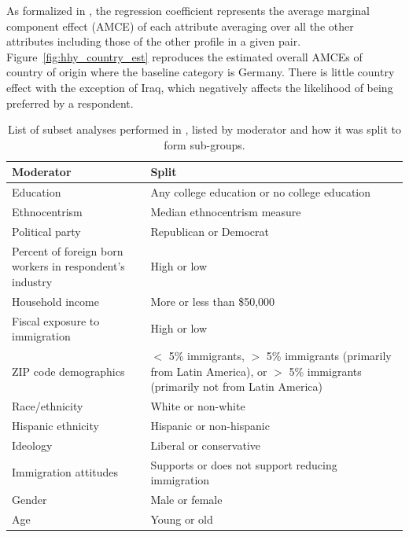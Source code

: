 As formalized in \cite{hainmueller2014causal}, the regression
coefficient represents the average marginal component effect (AMCE) of
each attribute averaging over all the other attributes including those
of the other profile in a given pair. 
Figure~\ref{fig:hhy_country_est} reproduces the estimated overall
AMCEs of country of origin where the baseline category is Germany.
There is little country effect with the exception of Iraq, which
negatively affects the likelihood of being preferred by a respondent.

\begin{table}[t!]
    \centering\small
    \begin{tabular}{|p{0.35\linewidth}|p{0.65\linewidth}|}
    \hline
    Moderator &Split\\
     \hline
     Education & Any college education or no college education\\
     Ethnocentrism & Median ethnocentrism measure\\
     Political party & Republican or Democrat\\
     Percent of foreign born workers in respondent's industry & High or low \\
     Household income & More or less than \$50,000\\
     Fiscal exposure to immigration & High or low\\
     ZIP code demographics & $<$ 5\% immigrants, $>$ 5\% immigrants (primarily from Latin America), or $>$ 5\% immigrants (primarily not from Latin America) \\
     Race/ethnicity & White or non-white\\
     Hispanic ethnicity & Hispanic or non-hispanic \\
     Ideology & Liberal or conservative\\
     Immigration attitudes & Supports or does not support reducing immigration\\
     Gender & Male or female \\
     Age & Young or old \\
     \hline
    \end{tabular}
     \caption{List of subset analyses performed in \cite{hainmueller2015hidden}, listed by moderator and how it was split to form sub-groups.}\label{tab:subsets}
\end{table}

